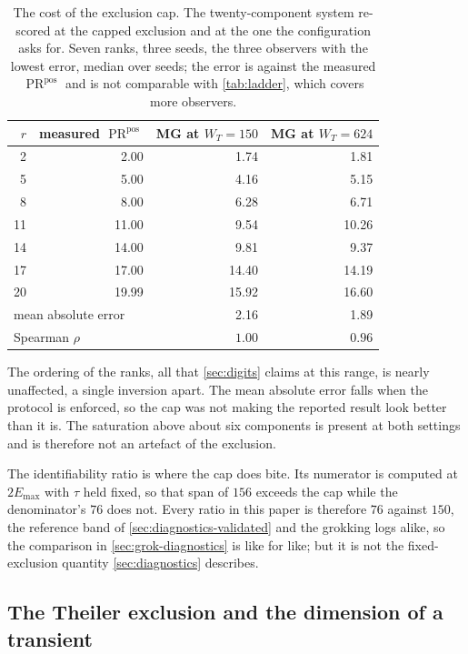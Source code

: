\documentclass{article}
\DeclareMathOperator{\PR}{PR}
\begin{document}
\begin{table}[H]
\centering
\caption{The cost of the exclusion cap. The twenty-component system re-scored at the capped
exclusion and at the one the configuration asks for. Seven ranks, three seeds, the three observers
with the lowest error, median over seeds; the error is against the measured $\PR^{\mathrm{pos}}$
and is not comparable with \cref{tab:ladder}, which covers more observers.}
\label{tab:theiler}
\begin{tabular}{rrrr}
\toprule
$r$ & measured $\PR^{\mathrm{pos}}$ & MG at $W_T = 150$ & MG at $W_T = 624$ \\
\midrule
 2 &  2.00 &  1.74 &  1.81 \\
 5 &  5.00 &  4.16 &  5.15 \\
 8 &  8.00 &  6.28 &  6.71 \\
11 & 11.00 &  9.54 &  10.26 \\
14 & 14.00 &  9.81 &  9.37 \\
17 & 17.00 & 14.40 & 14.19 \\
20 & 19.99 & 15.92 & 16.60 \\
\midrule
\multicolumn{2}{l}{mean absolute error} & 2.16 & 1.89 \\
\multicolumn{2}{l}{Spearman $\rho$}       & $1.00$ & $0.96$ \\
\bottomrule
\end{tabular}
\end{table}

The ordering of the ranks, all that \cref{sec:digits} claims at this range, is
nearly unaffected, a single inversion apart. The mean absolute error falls when the protocol is
enforced, so the cap was not making the reported result look better than it is. The saturation
above about six components is present at both settings and is therefore not an artefact of the
exclusion.

The identifiability ratio is where the cap does bite. Its numerator is computed at $2E_{\max}$
with $\tau$ held fixed, so that span of $156$ exceeds the cap while the denominator's $76$ does
not. Every ratio in this paper is therefore $76$ against $150$, the reference band of
\cref{sec:diagnostics-validated} and the grokking logs alike, so the comparison in
\cref{sec:grok-diagnostics} is like for like; but it is not the fixed-exclusion quantity
\cref{sec:diagnostics} describes.

\subsection{The Theiler exclusion and the dimension of a transient}\label{app:exclusion}
\end{document}
